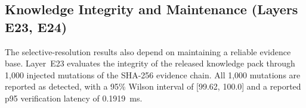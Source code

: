 \documentclass[a4paper,fleqn]{cas-dc}
\begin{document}
\begin{table}[pos=t]
\centering
\caption{End-to-end multimodal perception replay across held-out field library ($n=436$ spanning 45 pathological classes and 9 crop groups; 95\% Wilson CIs).}
\label{tab:multimodal_field_replay}
\small
{}
\end{table}


\subsection{Knowledge Integrity and Maintenance (Layers E23, E24)}

The selective-resolution results also depend on maintaining a reliable evidence base. Layer~E23 evaluates the integrity of the released knowledge pack through 1{,}000 injected mutations of the SHA-256 evidence chain. All 1{,}000 mutations are reported as detected, with a 95\% Wilson interval of [99.62, 100.0] and a reported p95 verification latency of 0.1919~ms.
\end{document}
